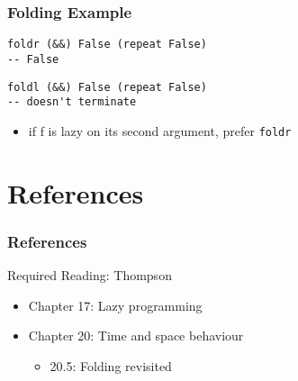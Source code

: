 \documentclass[dvipsnames]{beamer}
\theoremstyle{plain}
\begin{document}
\begin{frame}[fragile]
  \frametitle{Folding Example}

  \begin{lstlisting}
foldr (&&) False (repeat False)
-- False
  \end{lstlisting}

  \pause
  \begin{lstlisting}
foldl (&&) False (repeat False)
-- doesn't terminate
  \end{lstlisting}

  \pause
  \medskip
  \begin{itemize}
    \item if f is lazy on its second argument, prefer \lstinline|foldr|
  \end{itemize}
\end{frame}


\section*{References}

\begin{frame}
  \frametitle{References}

  \begin{block}{Required Reading: Thompson}
    \begin{itemize}
      \item Chapter 17: \alert{Lazy programming}
      \item Chapter 20: Time and space behaviour
      \begin{itemize}
        \item 20.5: \alert{Folding revisited}
      \end{itemize}
    \end{itemize}
  \end{block}
\end{frame}
\end{document}
